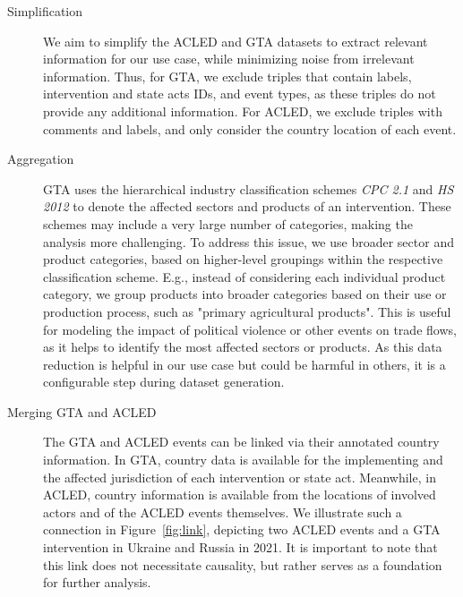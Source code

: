 \begin{description}
\item[Simplification] We aim to simplify the ACLED and GTA datasets to extract relevant information for our use case, while minimizing noise from irrelevant information. Thus, for GTA, we exclude triples that contain labels, intervention and state acts IDs, and event types, as these triples do not provide any additional information. For ACLED, we exclude triples with comments and labels, and only consider the country location of each event.

\item[Aggregation]
GTA uses the hierarchical industry classification schemes \textit{CPC 2.1} and \textit{HS 2012} to denote the affected sectors and products of an intervention. These schemes may include a very large number of categories, making the analysis more challenging. To address this issue, we use broader sector and product categories, based on higher-level groupings within the respective classification scheme. E.g., instead of considering each individual product category, we group products into broader categories based on their use or production process, such as "primary agricultural products". This is useful for modeling the impact of political violence or other events on trade flows, as it helps to identify the most affected sectors or products. 
As this data reduction is helpful in our use case but could be harmful in others, it is a configurable step during dataset generation.  
\item[Merging GTA and ACLED] The GTA and ACLED events can be linked via their annotated country information. In GTA, country data is available for the implementing and the affected jurisdiction of each intervention or state act. Meanwhile, in ACLED, country information is available from the locations of involved actors and of the ACLED events themselves. We illustrate such a connection in Figure~\ref{fig:link}, depicting two ACLED events and a GTA intervention in Ukraine and Russia in 2021. It is important to note that this link does not necessitate causality, but rather serves as a foundation for further analysis.


\end{description}
